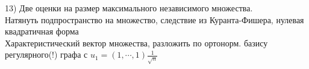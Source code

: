 13) Две оценки на размер максимального независимого множества.\\
    
Натянуть подпространство на  множество, следствие из Куранта-Фишера, нулевая квадратичная форма\\
Характеристический вектор множества, разложить по ортонорм. базису регулярного(!) графа с $u_1 = (1,\cdots,1) \frac{1}{\sqrt n}$\\
